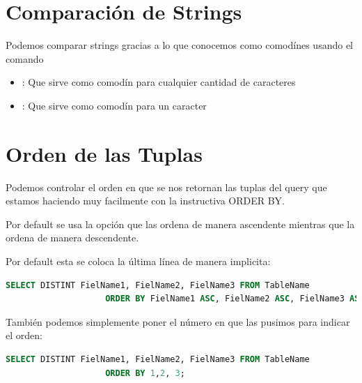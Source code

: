 \documentclass[12pt, fleqn]{report}                             %
\newcommand \Quote {\qq}                                        %
\begin{document}
        \section{Comparación de Strings}
            
            Podemos comparar strings gracias a lo que conocemos como comodínes usando
            el comando \Quote{LIKE}
            \begin{itemize}
                \item \Quote{\%}: Que sirve como comodín para cualquier cantidad de caracteres 
                \item \Quote{\_}: Que sirve como comodín para un caracter 
            \end{itemize}


        \section{Orden de las Tuplas}

            Podemos controlar el orden en que se nos retornan las tuplas del query que estamos
            haciendo muy facilmente con la instructiva ORDER BY.

            Por default se usa la opción \Quote{ASC} que las ordena de manera ascendente
            mientras que \Quote{DESC} la ordena de manera descendente.

            Por default esta se coloca la última línea de manera implicita:
            \begin{lstlisting}[language=SQL, gobble=16]
                SELECT DISTINT FielName1, FielName2, FielName3 FROM TableName
                    ORDER BY FielName1 ASC, FielName2 ASC, FielName3 ASC;
            \end{lstlisting}

            También podemos simplemente poner el número en que las pusimos para 
            indicar el orden:

            \begin{lstlisting}[language=SQL, gobble=16]
                SELECT DISTINT FielName1, FielName2, FielName3 FROM TableName
                    ORDER BY 1,2, 3;
            \end{lstlisting}
\end{document}
